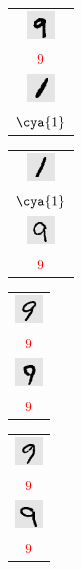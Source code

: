 \begin{figure}
          \begin{tabular}{c}\includegraphics[width=0.75cm]{example-mnist/mnist-trn-03}\\$\red{9}$\\\includegraphics[width=0.75cm]{example-mnist/mnist-trn-13}\\$\cya{1}$\end{tabular}%
          \begin{tabular}{c}\includegraphics[width=0.75cm]{example-mnist/mnist-trn-04}\\$\cya{1}$\\\includegraphics[width=0.75cm]{example-mnist/mnist-trn-14}\\$\red{9}$\end{tabular}%
          \begin{tabular}{c}\includegraphics[width=0.75cm]{example-mnist/mnist-trn-05}\\$\red{9}$\\\includegraphics[width=0.75cm]{example-mnist/mnist-trn-15}\\$\red{9}$\end{tabular}%
          \begin{tabular}{c}\includegraphics[width=0.75cm]{example-mnist/mnist-trn-06}\\$\red{9}$\\\includegraphics[width=0.75cm]{example-mnist/mnist-trn-16}\\$\red{9}$\end{tabular}%

\end{figure}

